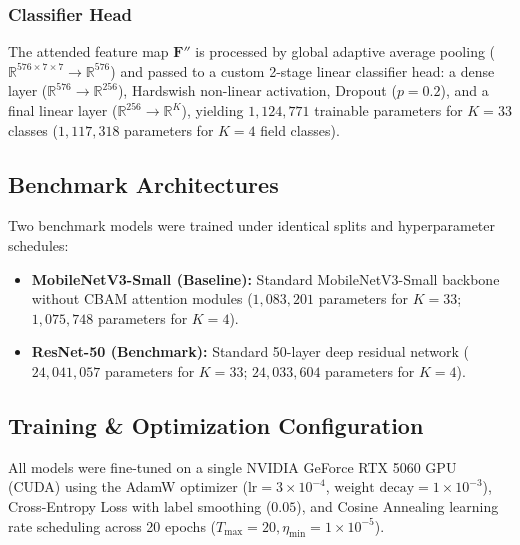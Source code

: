 \documentclass[conference]{IEEEtran}
\begin{document}
\subsubsection{Classifier Head}
The attended feature map $\mathbf{F}''$ is processed by global adaptive average pooling ($\mathbb{R}^{576 \times 7 \times 7} \to \mathbb{R}^{576}$) and passed to a custom 2-stage linear classifier head: a dense layer ($\mathbb{R}^{576} \to \mathbb{R}^{256}$), Hardswish non-linear activation, Dropout ($p = 0.2$), and a final linear layer ($\mathbb{R}^{256} \to \mathbb{R}^K$), yielding $1,124,771$ trainable parameters for $K=33$ classes ($1,117,318$ parameters for $K=4$ field classes).

\subsection{Benchmark Architectures}
Two benchmark models were trained under identical splits and hyperparameter schedules:
\begin{itemize}
    \item \textbf{MobileNetV3-Small (Baseline):} Standard MobileNetV3-Small backbone without CBAM attention modules ($1,083,201$ parameters for $K=33$; $1,075,748$ parameters for $K=4$).
    \item \textbf{ResNet-50 (Benchmark):} Standard 50-layer deep residual network ($24,041,057$ parameters for $K=33$; $24,033,604$ parameters for $K=4$).
\end{itemize}

\subsection{Training \& Optimization Configuration}
All models were fine-tuned on a single NVIDIA GeForce RTX 5060 GPU (CUDA) using the AdamW optimizer ($\text{lr} = 3 \times 10^{-4}$, $\text{weight decay} = 1 \times 10^{-3}$), Cross-Entropy Loss with label smoothing ($0.05$), and Cosine Annealing learning rate scheduling across 20 epochs ($T_{\max} = 20, \eta_{\min} = 1 \times 10^{-5}$).
\end{document}
